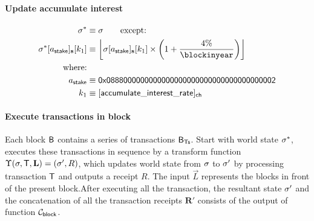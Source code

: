 \paragraph{Update accumulate interest}
\begin{align}
	\st^{*}&\eqdef \st \qquad \mbox{except:} \\ 
	\st^{*}[a_{\sf stake}]_{\bf s}[k_1] & \eqdef \left\lfloor\st[a_{\sf stake}]_{\bf s}[k_1] \times \left(1+\frac{4\%}{\blockinyear}\right)\right\rfloor\\
	\mbox{where:}& \\ 
	a_{\sf stake} & \eqdef \stakingcontract \\ 
	k_1 & \eqdef [{\sf accumulate\char`_interest\char`_rate}]_{\sf ch}
\end{align}

\paragraph{Execute transactions in block}

Each block $\textsf{B}$ contains a series of transactions $\textsf{B}_{\sf Ts}$. Start with world state $\mathbf{\sigma}^{*}$, \name executes these transactions in sequence by a transform function $\Upsilon(\mathbf{\sigma},\textsf{T},\mathbf{L})=(\mathbf{\sigma}',R)$, which updates world state from $\mathbf{\sigma}$ to $\mathbf{\sigma}'$ by processing transaction $\textsf{T}$ and outputs a receipt $R$. The input $\vec{L}$ represents the blocks in front of the present block.After executing all the transaction, the resultant state $\mathbf{\sigma}'$ and the concatenation of all the transaction receipts $\mathbf{R}'$ consists of the output of function $\mathcal{C}_{\sf block}$.
